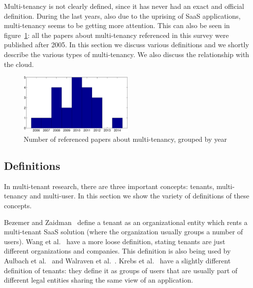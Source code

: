 Multi-tenancy is not clearly defined, since it has never had an exact and official definition. During the last years, also due to the uprising of \ac{SaaS} applications, multi-tenancy seems to be getting more attention. This can also be seen in figure~\ref{fig:papercount}: all the papers about multi-tenancy referenced in this survey were published after 2005. In this section we discuss various definitions and we shortly describe the various types of multi-tenancy. We also discuss the relationship with the cloud.

\begin{figure}[H]
	\centering
		\includegraphics[width=0.5\textwidth]{assets/papers.eps}
		\caption{Number of referenced papers about multi-tenancy, grouped by year}
		\label{fig:papercount}
\end{figure}

\subsection{Definitions}

In multi-tenant research, there are three important concepts: tenants, multi-tenancy and multi-user. In this section we show the variety of definitions of these concepts.

Bezemer and Zaidman~\cite{bezemer2010multi} define a tenant as an organizational entity which rents a multi-tenant \ac{SaaS} solution (where the organization usually groups a number of users). Wang et al.~\cite{wang2008study} have a more loose definition, stating tenants are just different organizations and companies. This definition is also being used by Aulbach et al.~\cite{aulbach2008multi} and Walraven et al.~\cite{walraven2012towards}. Krebs et al.~\cite{krebs2012architecture} have a slightly different definition of tenants: they define it as groups of users that are usually part of different legal entities sharing the same view of an application.

